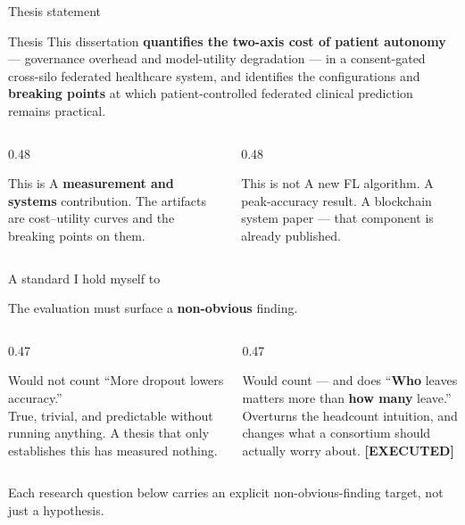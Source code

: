 \documentclass[aspectratio=169, 11pt]{beamer}
\newcommand{\done}{{\color{mTeal}\textbf{[EXECUTED]}}}
\newcommand{\hl}[1]{{\color{mCoral}\textbf{#1}}}
\begin{document}
\begin{frame}{Thesis statement}
\begin{alertblock}{Thesis}
This dissertation \textbf{quantifies the two-axis cost of patient
autonomy} --- governance overhead and model-utility degradation --- in a
consent-gated cross-silo federated healthcare system, and identifies the
configurations and \textbf{breaking points} at which patient-controlled
federated clinical prediction remains practical.
\end{alertblock}
\vspace{0.7em}
\begin{columns}[T]
\begin{column}{0.48\textwidth}
\begin{exampleblock}{This is}
A \textbf{measurement and systems} contribution. The artifacts are
cost--utility curves and the breaking points on them.
\end{exampleblock}
\end{column}
\begin{column}{0.48\textwidth}
\begin{block}{This is not}
A new FL algorithm. A peak-accuracy result. A blockchain system paper ---
that component is already published.
\end{block}
\end{column}
\end{columns}
\end{frame}

\begin{frame}{A standard I hold myself to}
\begin{center}
\large
The evaluation must surface a \hl{non-obvious} finding.
\end{center}
\vspace{0.8em}
\begin{columns}[T]
\begin{column}{0.47\textwidth}
\begin{block}{Would not count}
``More dropout lowers accuracy.''\\[0.4em]
{\footnotesize True, trivial, and predictable without running anything.
A thesis that only establishes this has measured nothing.}
\end{block}
\end{column}
\begin{column}{0.47\textwidth}
\begin{exampleblock}{Would count --- and does}
``\textbf{Who} leaves matters more than \textbf{how many} leave.''\\[0.4em]
{\footnotesize Overturns the headcount intuition, and changes what a
consortium should actually worry about. \done}
\end{exampleblock}
\end{column}
\end{columns}
\vspace{0.6em}
{\footnotesize Each research question below carries an explicit
non-obvious-finding target, not just a hypothesis.}
\end{frame}
\end{document}
